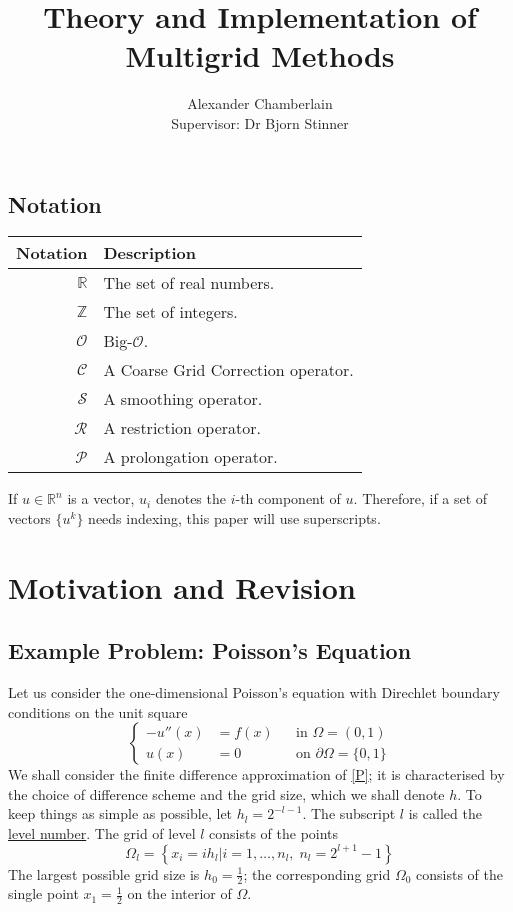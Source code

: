 \documentclass[a4paper,10pt,oneside]{book}
\title{Theory and Implementation of Multigrid Methods}
\author{Alexander Chamberlain\\Supervisor: Dr Bjorn Stinner}
\theoremstyle{plain}%
\theoremstyle{definition}
\theoremstyle{remark}
\newcommand{\bbR}{\mathbb{R}}
\newcommand{\bbZ}{\mathbb{Z}}
\newcommand{\calC}{\mathcal{C}}
\newcommand{\calO}{\mathcal{O}}
\newcommand{\calS}{\mathcal{S}}
\newcommand{\calR}{\mathcal{R}}
\newcommand{\calP}{\mathcal{P}}
\newcommand{\hl}{h_l} %
\newcommand{\Omegal}{\Omega_l} %
\newcommand{\nl}{n_l} %
\begin{document}
\nocite{*}
\maketitle

\section*{Notation}
\begin{center}
\begin{tabular}{rl}
 \toprule
 Notation & Description\\
 \midrule
 $\bbR$ & The set of real numbers.\\
 $\bbZ$ & The set of integers.\\
 $\calO$ & Big-$\calO$.\\
 $\calC$ & A Coarse Grid Correction operator.\\
 $\calS$ & A smoothing operator.\\
 $\calR$ & A restriction operator.\\
 $\calP$ & A prolongation operator.
\end{tabular}
\end{center}

If $u\in\bbR^n$ is a vector, $u_i$ denotes the $i$-th component of $u$.
Therefore, if a set of vectors $\{u^k\}$ needs indexing, this paper will use
superscripts.

\tableofcontents

\chapter{Motivation and Revision}
\section{Example Problem: Poisson's Equation}
Let us consider the one-dimensional Poisson's equation with Direchlet boundary
conditions on the unit square
\begin{equation}
 \left\{
 \begin{aligned}
  -u''(x)&=f(x)&&\text{in }\Omega=(0,1)\\
  u(x)&=0&&\text{on }\partial\Omega=\{0,1\}
 \end{aligned}
 \right.\label{P}
\end{equation}
We shall consider the finite difference approximation of \eqref{P}; it is
characterised by the choice of difference scheme and the grid size, which we
shall denote $h$. To keep things as simple as possible, let $\hl=2^{-l-1}$. The
subscript $l$ is called the \underline{level number}. The grid of level $l$
consists of the points
\begin{equation}
 \Omegal =\left\{x_i=i\hl\big|i=1,\dotsc,\nl,\;\nl=2^{l+1}-1\right\}
\end{equation}
The largest possible grid size is $h_0=\frac{1}{2}$; the corresponding grid
$\Omega_0$ consists of the single point $x_1=\frac{1}{2}$ on the interior of
$\Omega$.
\end{document}
